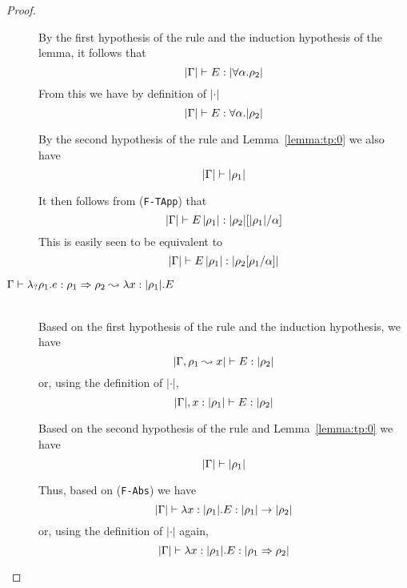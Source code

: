 \begin{proof}
\begin{description}
  By the first hypothesis of the rule and the induction hypothesis of the
  lemma, it follows that
\begin{equation*} 
    |\Gamma| \vdash E : |\forall \alpha.\rho_2|
\end{equation*} 
  From this we have by definition of $|\cdot|$
\begin{equation*} 
    |\Gamma| \vdash E : \forall{\alpha}.|\rho_2|
\end{equation*} 

  By the second hypothesis of the rule and Lemma~\ref{lemma:tp:0} we also have
\begin{equation*} 
    |\Gamma| \vdash |\rho_1|
\end{equation*} 

  It then follows from (\texttt{F-TApp}) that
\begin{equation*} 
    |\Gamma| \vdash E\,|\rho_1| : |\rho_2|[|\rho_1|/\alpha]
\end{equation*} 
  This is easily seen to be equivalent to 
\begin{equation*} 
    |\Gamma| \vdash E\,|\rho_1| : |\rho_2[\rho_1/\alpha]|
\end{equation*} 

\item[\fbox{\texttt{(Ty-IAbs)}}\quad$\Gamma \vdash \lambda_{?} \rho_1.e : \rho_1 \Rightarrow \rho_2 \leadsto \lambda x:|\rho_1|.E$]\ \\

  Based on the first hypothesis of the rule and the induction hypothesis, we have
\begin{equation*} 
    |\Gamma, \rho_1 \leadsto x| \vdash E : |\rho_2|
\end{equation*}
  or, using the definition of $|\cdot|$,
\begin{equation*} 
    |\Gamma|, x : |\rho_1| \vdash E : |\rho_2|
\end{equation*}

  Based on the second hypothesis of the rule and Lemma~\ref{lemma:tp:0} we have
\begin{equation*} 
    |\Gamma| \vdash |\rho_1|
\end{equation*}

  Thus, based on (\texttt{F-Abs}) we have
\begin{equation*} 
    |\Gamma| \vdash \lambda x : |\rho_1|.E : |\rho_1| \rightarrow |\rho_2|
\end{equation*}
  or, using the definition of $|\cdot|$ again,
\begin{equation*} 
    |\Gamma| \vdash \lambda x : |\rho_1|.E : |\rho_1 \Rightarrow \rho_2|
\end{equation*}
 

\end{description}
\end{proof}
